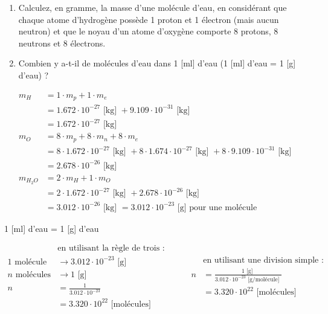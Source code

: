 \documentclass[
  11pt,
  french,
  a4paper,
  openany]{book}
\providecommand{\tightlist}{%
  \setlength{\itemsep}{0pt}\setlength{\parskip}{0pt}}
\begin{document}
\begin{Exercise}

\begin{enumerate}
\def\labelenumi{\arabic{enumi}.}
\tightlist
\item
  Calculez, en gramme, la masse d'une molécule d'eau, en considérant que chaque atome d'hydrogène possède 1 proton et 1 électron (mais aucun neutron) et que le noyau d'un atome d'oxygène comporte 8 protons, 8 neutrons et 8 électrons.
\item
  Combien y a-t-il de molécules d'eau dans 1 {[}ml{]} d'eau (1 {[}ml{]} d'eau = 1 {[}g{]} d'eau) ?
\end{enumerate}


\end{Exercise}

\begin{Answer}
\[ \begin{split}
    m_{H} &= 1 \cdot m_{p} + 1 \cdot m_{e}\\
          &= 1.672\cdot10^{-27}\text{ [kg] } + 9.109\cdot10^{-31}\text{ [kg] }\\
          &= 1.672\cdot10^{-27}\text{ [kg] }\\
    m_{O} &= 8 \cdot m_{p} + 8 \cdot m_{n} + 8 \cdot m_{e}\\
          &= 8 \cdot 1.672\cdot10^{-27}\text{ [kg] } + 8 \cdot 1.674\cdot10^{-27}\text{ [kg] } + 8 \cdot 9.109\cdot10^{-31}\text{ [kg] }\\
          &= 2.678\cdot10^{-26}\text{ [kg] }\\
    m_{H_{2}O} &= 2 \cdot m_{H} + 1 \cdot m_{O}\\
          &= 2 \cdot 1.672\cdot10^{-27}\text{ [kg] } + 2.678\cdot10^{-26}\text{ [kg] }\\
          &= 3.012\cdot10^{-26}\text{ [kg] } = 3.012\cdot10^{-23} \text{ [g] pour une molécule}
\end{split} \]

1 {[}ml{]} d'eau = 1 {[}g{]} d'eau

\[ \begin{split}
    & \text{en utilisant la règle de trois : } \\
    1 \text{ molécule} &\rightarrow 3.012\cdot10^{-23} \text{ [g] }\\
    n \text{ molécules} &\rightarrow 1 \text{ [g] }\\
    n &= \frac{1}{3.012\cdot10^{-23}}\\
      &= 3.320\cdot10^{22} \text{ [molécules]}
\end{split}
\qquad
\begin{split}
    & \text{en utilisant une division simple : } \\
    n &= \frac{1\text{ [g] }}{ 3.012\cdot10^{-23} \text{ [g/molécule] } } \\
    &= 3.320\cdot10^{22} \text{ [molécules]}
\end{split} \]

\end{Answer}
\end{document}
